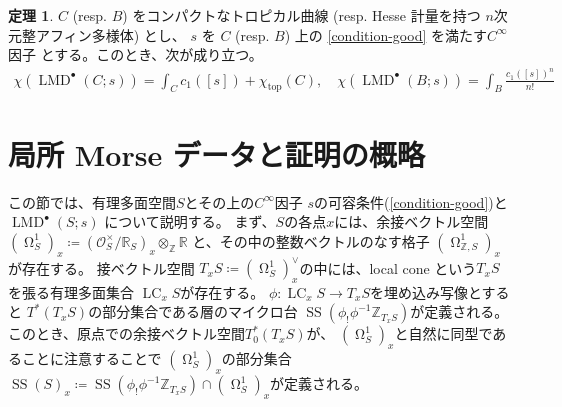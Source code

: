 \documentclass[uplatex,dvipdfmx,12pt]{jsarticle}
\numberwithin{equation}{section}
\theoremstyle{definition}
\newtheorem{theorem}{定理}[section]
\newcommand{\deq}{\coloneqq}
\newcommand{\opn}[1]{\operatorname{#1}}
\newcommand{\beforesection}{\vspace{-15pt}}
\newcommand{\aftersection}{\vspace{-8pt}}
\DeclareMathOperator{\tform}{\Omega}
\begin{document}
\begin{theorem} \label{theorem-main}
$C$ (resp. $B$) をコンパクトなトロピカル曲線 (resp. Hesse 計量を持つ
$n$次元整アフィン多様体) とし、
$s$ を $C$ (resp. $B$) 上の
\cref{condition-good} を満たす$C^{\infty}$因子 
とする。このとき、次が成り立つ。
\begin{align}
\chi(\opn{LMD}^{\bullet}(C;s))=\int_C c_1([s])+
\chi_{\opn{top}}(C), \quad
\chi(\opn{LMD}^{\bullet}(B;s))=\int_B \frac{c_1([s])^n}{n!}
\end{align}
\end{theorem}

\beforesection

\section{局所 Morse データと証明の概略}

\aftersection

この節では、有理多面空間$S$とその上の$C^{\infty}$因子
$s$の可容条件(\cref{condition-good})と 
$\opn{LMD}^{\bullet}(S;s)$ について説明する。
まず、$S$の各点$x$には、余接ベクトル空間
$(\tform^{1}_{S})_x\deq
(\mathcal{O}_S^{\times}/\mathbb{R}_S)_x
\otimes_{\mathbb{Z}}\mathbb{R}$
と、その中の整数ベクトルのなす格子
$(\tform^{1}_{\mathbb{Z},S})_x$が存在する。
接ベクトル空間
$T_x S\deq(\tform^{1}_{S})_x^{\vee}$の中には、local cone
という$T_xS$を張る有理多面集合
$\opn{LC}_x S$が存在する。
$\phi \colon \opn{LC}_x S\to T_x S$を埋め込み写像とすると
$T^{*}(T_xS)$の部分集合である層のマイクロ台
$\opn{SS}(\phi_!\phi^{-1}\mathbb{Z}_{T_xS})$が定義される。
このとき、原点での余接ベクトル空間$T^{*}_0(T_xS)$が、
$(\tform_S^{1})_x$と自然に同型であることに注意することで
$(\tform_S^{1})_x$の部分集合
$\opn{SS}(S)_x\deq \opn{SS}(\phi_!\phi^{-1}\mathbb{Z}_{T_xS})
\cap (\tform_S^{1})_x$が定義される。
\end{document}
